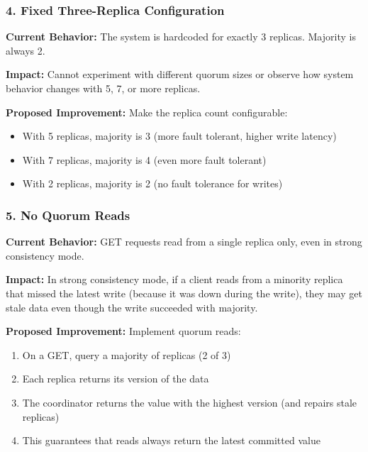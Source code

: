 \documentclass[10pt,a4paper]{article}
\begin{document}
\subsubsection{4. Fixed Three-Replica Configuration}

\textbf{Current Behavior:} The system is hardcoded for exactly 3 replicas. Majority is always 2.

\textbf{Impact:} Cannot experiment with different quorum sizes or observe how system behavior changes with 5, 7, or more replicas.

\textbf{Proposed Improvement:} Make the replica count configurable:
\begin{itemize}
    \item With 5 replicas, majority is 3 (more fault tolerant, higher write latency)
    \item With 7 replicas, majority is 4 (even more fault tolerant)
    \item With 2 replicas, majority is 2 (no fault tolerance for writes)
\end{itemize}

\subsubsection{5. No Quorum Reads}

\textbf{Current Behavior:} GET requests read from a single replica only, even in strong consistency mode.

\textbf{Impact:} In strong consistency mode, if a client reads from a minority replica that missed the latest write (because it was down during the write), they may get stale data even though the write succeeded with majority.

\textbf{Proposed Improvement:} Implement quorum reads:
\begin{enumerate}
    \item On a GET, query a majority of replicas (2 of 3)
    \item Each replica returns its version of the data
    \item The coordinator returns the value with the highest version (and repairs stale replicas)
    \item This guarantees that reads always return the latest committed value
\end{enumerate}

\newpage

\end{document}
